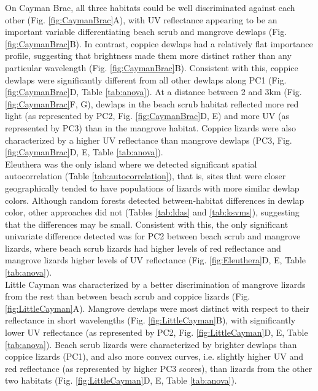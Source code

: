 On Cayman Brac, all three habitats could be well discriminated against each other (Fig. \ref{fig:CaymanBrac}A), with UV reflectance appearing to be an important variable differentiating beach scrub and mangrove dewlaps (Fig. \ref{fig:CaymanBrac}B). In contrast, coppice dewlaps had a relatively flat importance profile, suggesting that brightness made them more distinct rather than any particular wavelength (Fig. \ref{fig:CaymanBrac}B). Consistent with this, coppice dewlaps were significantly different from all other dewlaps along PC1 (Fig. \ref{fig:CaymanBrac}D, Table \ref{tab:anova}). At a distance between 2 and 3km (Fig. \ref{fig:CaymanBrac}F, G), dewlaps in the beach scrub habitat reflected more red light (as represented by PC2, Fig. \ref{fig:CaymanBrac}D, E) and more UV (as represented by PC3) than in the mangrove habitat. Coppice lizards were also characterized by a higher UV reflectance than mangrove dewlaps (PC3, Fig. \ref{fig:CaymanBrac}D, E, Table \ref{tab:anova}).\\

Eleuthera was the only island where we detected significant spatial autocorrelation (Table \ref{tab:autocorrelation}), that is, sites that were closer geographically tended to have populations of lizards with more similar dewlap colors. Although random forests detected between-habitat differences in dewlap color, other approaches did not (Tables \ref{tab:ldas} and \ref{tab:ksvms}), suggesting that the differences may be small. Consistent with this, the only significant univariate difference detected was for PC2 between beach scrub and mangrove lizards, where beach scrub lizards had higher levels of red reflectance and mangrove lizards higher levels of UV reflectance (Fig. \ref{fig:Eleuthera}D, E, Table \ref{tab:anova}).\\

Little Cayman was characterized by a better discrimination of mangrove lizards from the rest than between beach scrub and coppice lizards (Fig. \ref{fig:LittleCayman}A). Mangrove dewlaps were most distinct with respect to their reflectance in short wavelengths (Fig. \ref{fig:LittleCayman}B), with significantly lower UV reflectance (as represented by PC2, Fig. \ref{fig:LittleCayman}D, E, Table \ref{tab:anova}). Beach scrub lizards were characterized by brighter dewlaps than coppice lizards (PC1), and also more convex curves, i.e. slightly higher UV and red reflectance (as represented by higher PC3 scores), than lizards from the other two habitats (Fig. \ref{fig:LittleCayman}D, E, Table \ref{tab:anova}).\\

